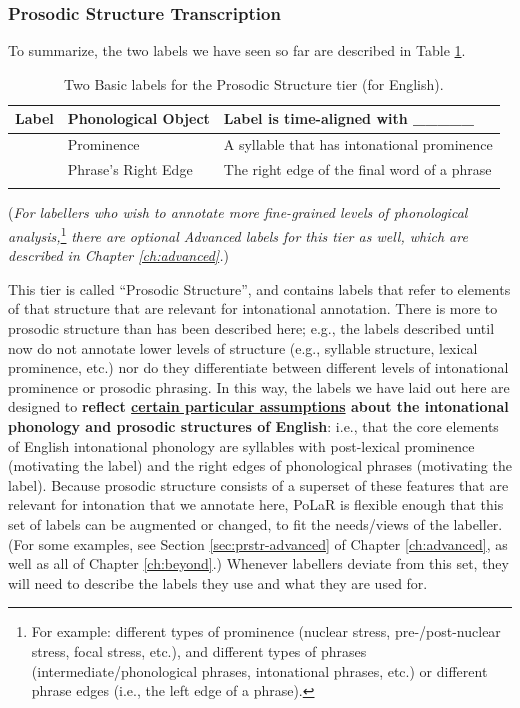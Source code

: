 \documentclass[11pt, twoside]{memoir}
\def\textlabel#1{{\relsize{-.5}\fontspec[Mapping=tex-text]{Roboto Mono}{#1}}}
\begin{document}
\subsubsection{Prosodic Structure Transcription}
To summarize, the two labels we have seen so far are described in Table \ref{2 PrStr basic labels}.
\begin{longtable}{cll} \toprule \textbf{Label} & \textbf{Phonological Object} & \textbf{Label is time-aligned with \_\_\_\_\_}\tabularnewline
\midrule \endhead
\textlabel{*} & Prominence & A syllable that has intonational prominence \tabularnewline
\textlabel{]} & Phrase’s Right Edge & The right edge of the final word of a phrase \tabularnewline
\bottomrule 
\caption{Two Basic labels for the Prosodic Structure tier (for English).
\label{2 PrStr basic labels}
}
\end{longtable}
(\textit{For labellers who wish to annotate more fine-grained levels of phonological analysis,}\footnote{For example: different types of prominence (nuclear stress, pre-\slash post-nuclear stress, focal stress, etc.), and different types of phrases (intermediate\slash phonological phrases, intonational phrases, etc.) or different phrase edges (i.e., the left edge of a phrase).} \textit{there are optional Advanced labels for this tier as well, which are described in Chapter \ref{ch:advanced}.})
\begin{infobox}[frametitle=\textbf{A side-note about this tier}]
This tier is called “Prosodic Structure”, and contains labels that refer to elements of that structure that are relevant for intonational annotation. There is more to prosodic structure than has been described here; e.g., the labels described until now do not annotate lower levels of structure (e.g., syllable structure, lexical prominence, etc.) nor do they differentiate between different levels of intonational prominence or prosodic phrasing. In this way, the labels we have laid out here are designed to \textbf{reflect \uline{certain particular assumptions} about the intonational phonology and prosodic structures of English}: i.e., that the core elements of English intonational phonology are syllables with post-lexical prominence (motivating the \textlabel{*} label) and the right edges of phonological phrases (motivating the \textlabel{]} label). Because prosodic structure consists of a superset of these features that are relevant for intonation that we annotate here, PoLaR is flexible enough that this set of labels can be augmented or changed, to fit the needs\slash views of the labeller. (For some examples, see Section \ref{sec:prstr-advanced} of Chapter \ref{ch:advanced}, as well as all of Chapter \ref{ch:beyond}.) Whenever labellers deviate from this set, they will need to describe the labels they use and what they are used for.
\end{infobox}
\end{document}
